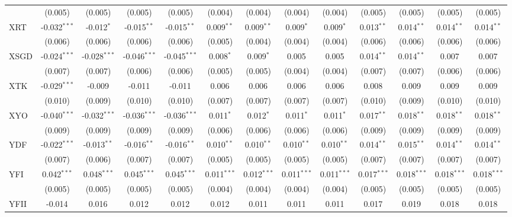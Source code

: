 \begin{table}[!htbp]
\begin{tabular}{@{\extracolsep{5pt}}lcccccccccccc}
  & (0.005) & (0.005) & (0.005) & (0.005) & (0.004) & (0.004) & (0.004) & (0.004) & (0.005) & (0.005) & (0.005) & (0.005) \\
 XRT & -0.032$^{***}$ & -0.012$^{*}$ & -0.015$^{**}$ & -0.015$^{**}$ & 0.009$^{**}$ & 0.009$^{**}$ & 0.009$^{*}$ & 0.009$^{*}$ & 0.013$^{**}$ & 0.014$^{**}$ & 0.014$^{**}$ & 0.014$^{**}$ \\
  & (0.006) & (0.006) & (0.006) & (0.006) & (0.005) & (0.004) & (0.004) & (0.004) & (0.006) & (0.006) & (0.006) & (0.006) \\
 XSGD & -0.024$^{***}$ & -0.028$^{***}$ & -0.046$^{***}$ & -0.045$^{***}$ & 0.008$^{*}$ & 0.009$^{*}$ & 0.005$^{}$ & 0.005$^{}$ & 0.014$^{**}$ & 0.014$^{**}$ & 0.007$^{}$ & 0.007$^{}$ \\
  & (0.007) & (0.007) & (0.006) & (0.006) & (0.005) & (0.005) & (0.004) & (0.004) & (0.007) & (0.007) & (0.006) & (0.006) \\
 XTK & -0.029$^{***}$ & -0.009$^{}$ & -0.011$^{}$ & -0.011$^{}$ & 0.006$^{}$ & 0.006$^{}$ & 0.006$^{}$ & 0.006$^{}$ & 0.008$^{}$ & 0.009$^{}$ & 0.009$^{}$ & 0.009$^{}$ \\
  & (0.010) & (0.009) & (0.010) & (0.010) & (0.007) & (0.007) & (0.007) & (0.007) & (0.010) & (0.009) & (0.010) & (0.010) \\
 XYO & -0.040$^{***}$ & -0.032$^{***}$ & -0.036$^{***}$ & -0.036$^{***}$ & 0.011$^{*}$ & 0.012$^{*}$ & 0.011$^{*}$ & 0.011$^{*}$ & 0.017$^{**}$ & 0.018$^{**}$ & 0.018$^{**}$ & 0.018$^{**}$ \\
  & (0.009) & (0.009) & (0.009) & (0.009) & (0.006) & (0.006) & (0.006) & (0.006) & (0.009) & (0.009) & (0.009) & (0.009) \\
 YDF & -0.022$^{***}$ & -0.013$^{**}$ & -0.016$^{**}$ & -0.016$^{**}$ & 0.010$^{**}$ & 0.010$^{**}$ & 0.010$^{**}$ & 0.010$^{**}$ & 0.014$^{**}$ & 0.015$^{**}$ & 0.014$^{**}$ & 0.014$^{**}$ \\
  & (0.007) & (0.006) & (0.007) & (0.007) & (0.005) & (0.005) & (0.005) & (0.005) & (0.007) & (0.007) & (0.007) & (0.007) \\
 YFI & 0.042$^{***}$ & 0.048$^{***}$ & 0.045$^{***}$ & 0.045$^{***}$ & 0.011$^{***}$ & 0.012$^{***}$ & 0.011$^{***}$ & 0.011$^{***}$ & 0.017$^{***}$ & 0.018$^{***}$ & 0.018$^{***}$ & 0.018$^{***}$ \\
  & (0.005) & (0.005) & (0.005) & (0.005) & (0.004) & (0.004) & (0.004) & (0.004) & (0.005) & (0.005) & (0.005) & (0.005) \\
 YFII & -0.014$^{}$ & 0.016$^{}$ & 0.012$^{}$ & 0.012$^{}$ & 0.012$^{}$ & 0.011$^{}$ & 0.011$^{}$ & 0.011$^{}$ & 0.017$^{}$ & 0.019$^{}$ & 0.018$^{}$ & 0.018$^{}$ \\

\end{tabular}
\end{table}
